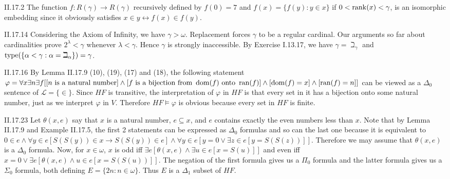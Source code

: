 \documentclass[12pt]{article}
\begin{document}
\begin{customthm}{II.17.2}
  The function $f:R(\gamma)\rightarrow R(\gamma)$ recursively defined by $f(0)=7$ and $f(x)=\{f(y):y\in x\}$ if $0<\mathop{\mathrm{rank}}(x)<\gamma$, is an isomorphic embedding since it obviously satisfies $x\in y\leftrightarrow f(x)\in f(y)$.
\end{customthm}

\begin{customthm}{II.17.14}
  Considering the Axiom of Infinity, we have $\gamma>\omega$. Replacement forces $\gamma$ to be a regular cardinal. Our arguments so far about cardinalities prove $2^\lambda<\gamma$ whenever $\lambda<\gamma$. Hence $\gamma$ is strongly inaccessible. By Exercise I.13.17, we have $\gamma=\beth_\gamma$ and $\mathop{\mathrm{type}}(\{\alpha<\gamma:\alpha=\beth_\alpha\})=\gamma$.
\end{customthm}

\begin{customthm}{II.17.16}
  By Lemma II.17.9 (10), (19), (17) and (18), the following statement $\varphi=\forall x\exists n\exists f[[n\textrm{ is a natural number}]\wedge[f\textrm{ is a bijection from }\mathop{\mathrm{dom}}(f)\textrm{ onto }\mathop{\mathrm{ran}}(f)]\wedge[\mathop{\mathrm{dom}}(f)=x]\wedge[\mathop{\mathrm{ran}}(f)=n]]$ can be viewed as a $\Delta_0$ sentence of $\mathcal{L}=\{\in\}$. Since $HF$ is transitive, the interpretation of $\varphi$ in $HF$ is that every set in it has a bijection onto some natural number, just as we interpret $\varphi$ in $V$. Therefore $HF\models\varphi$ is obvious because every set in $HF$ is finite.
\end{customthm}

\begin{customthm}{II.17.23}
  Let $\theta(x,e)$ say that $x$ is a natural number, $e\subseteq x$, and $e$ contains exactly the even numbers less than $x$. Note that by Lemma II.17.9 and Example II.17.5, the first 2 statements can be expressed as $\Delta_0$ formulas and so can the last one because it is equivalent to $0\in e\wedge\forall y\in e[S(S(y))\in x\rightarrow S(S(y))\in e]\wedge\forall y\in e[y=0\vee\exists z\in e[y=S(S(z))]]$. Therefore we may assume that $\theta(x,e)$ is a $\Delta_0$ formula. Now, for $x\in\omega$, $x$ is odd iff $\exists e[\theta(x,e)\wedge\exists u\in e[x=S(u)]]$ and even iff $x=0\vee\exists e[\theta(x,e)\wedge u\in e[x=S(S(u))]]$. The negation of the first formula gives us a $\Pi_0$ formula and the latter formula gives us a $\Sigma_0$ formula, both defining $E=\{2n:n\in\omega\}$. Thus $E$ is a $\Delta_1$ subset of $HF$.
\end{customthm}
\end{document}
